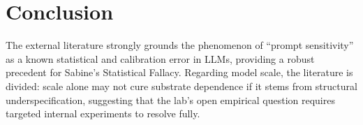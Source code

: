 \documentclass[12pt,a4paper]{article}
\begin{document}
\section{Conclusion}

The external literature strongly grounds the phenomenon of ``prompt sensitivity'' as a known statistical and calibration error in LLMs, providing a robust precedent for Sabine's Statistical Fallacy. Regarding model scale, the literature is divided: scale alone may not cure substrate dependence if it stems from structural underspecification, suggesting that the lab's open empirical question requires targeted internal experiments to resolve fully.
\end{document}
